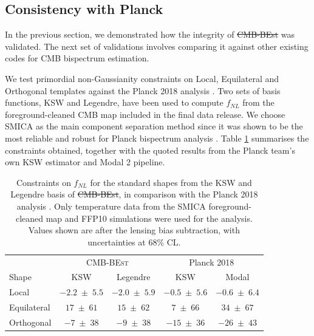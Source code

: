 \documentclass[a4paper,12pt,times,custombib,print,index]{Classes/PhDThesisPSnPDF} %
\providecommand{\DIFadd}[1]{{\protect\color{blue}\uwave{#1}}} %
\providecommand{\DIFdel}[1]{{\protect\color{red}\sout{#1}}}                      %
\providecommand{\DIFaddbegin}{} %
\providecommand{\DIFaddend}{} %
\providecommand{\DIFdelbegin}{} %
\providecommand{\DIFdelend}{} %
\providecommand{\DIFaddFL}[1]{\DIFadd{#1}} %
\providecommand{\DIFdelFL}[1]{\DIFdel{#1}} %
\providecommand{\DIFaddbeginFL}{} %
\providecommand{\DIFaddendFL}{} %
\providecommand{\DIFdelbeginFL}{} %
\providecommand{\DIFdelendFL}{} %
\newcommand{\DIFscaledelfig}{0.5}
\newlength{\DIFdelgraphicswidth} %
\newlength{\DIFdelgraphicsheight} %
\newcommand{\DIFaddincludegraphics}[2][]{{\color{blue}\fbox{\DIFOincludegraphics[#1]{#2}}}} %
\newcommand{\DIFdelincludegraphics}[2][]{%
\sbox{\DIFdelgraphicsbox}{\DIFOincludegraphics[#1]{#2}}%
\settoboxwidth{\DIFdelgraphicswidth}{\DIFdelgraphicsbox} %
\settoboxtotalheight{\DIFdelgraphicsheight}{\DIFdelgraphicsbox} %
\scalebox{\DIFscaledelfig}{%
\parbox[b]{\DIFdelgraphicswidth}{\usebox{\DIFdelgraphicsbox}\\[-\baselineskip] \rule{\DIFdelgraphicswidth}{0em}}\llap{\resizebox{\DIFdelgraphicswidth}{\DIFdelgraphicsheight}{%
\setlength{\unitlength}{\DIFdelgraphicswidth}%
\begin{picture}(1,1)%
\thicklines\linethickness{2pt} %
{\color[rgb]{1,0,0}\put(0,0){\framebox(1,1){}}}%
{\color[rgb]{1,0,0}\put(0,0){\line( 1,1){1}}}%
{\color[rgb]{1,0,0}\put(0,1){\line(1,-1){1}}}%
\end{picture}%
}\hspace*{3pt}}} %
} %
\DeclareRobustCommand{\DIFaddbegin}{\DIFOaddbegin \let\includegraphics\DIFaddincludegraphics} %
\DeclareRobustCommand{\DIFaddend}{\DIFOaddend \let\includegraphics\DIFOincludegraphics} %
\DeclareRobustCommand{\DIFdelbegin}{\DIFOdelbegin \let\includegraphics\DIFdelincludegraphics} %
\DeclareRobustCommand{\DIFdelend}{\DIFOaddend \let\includegraphics\DIFOincludegraphics} %
\DeclareRobustCommand{\DIFaddbeginFL}{\DIFOaddbeginFL \let\includegraphics\DIFaddincludegraphics} %
\DeclareRobustCommand{\DIFaddendFL}{\DIFOaddendFL \let\includegraphics\DIFOincludegraphics} %
\DeclareRobustCommand{\DIFdelbeginFL}{\DIFOdelbeginFL \let\includegraphics\DIFdelincludegraphics} %
\DeclareRobustCommand{\DIFdelendFL}{\DIFOaddendFL \let\includegraphics\DIFOincludegraphics} %
\begin{document}
\subsection{Consistency with Planck} \label{section:consistency_with_Planck}

In the previous section, we demonstrated how the integrity of \DIFdelbegin \DIFdel{CMB-BEst }\DIFdelend \DIFaddbegin \textsc{\DIFadd{CMB-BEst}} \DIFaddend was validated. The next set of validations involves comparing it against other existing codes for CMB bispectrum estimation.

We test primordial non-Gaussianity constraints on Local, Equilateral and Orthogonal templates against the Planck 2018 analysis \cite{PlanckCollaboration2018}. Two sets of basis functions, KSW and Legendre, have been used to compute \DIFdelbegin \DIFdel{$f_{NL}$ }\DIFdelend \DIFaddbegin \DIFadd{$f_\text{NL}$ }\DIFaddend from the foreground-cleaned CMB map included in the final data release. We choose SMICA as the main component separation method since it was shown to be the most reliable and robust for Planck bispectrum analysis \cite{PlanckCollaboration2013ComponentSeparation, PlanckCollaboration2013,PlanckCollaboration2015,PlanckCollaboration2018}. Table \ref{table:trio_fNL_comparison_with_planck} summarises the constraints obtained, together with the quoted results from the Planck team's own KSW estimator and Modal 2 pipeline.

\begin{table}[h]
	\caption{Constraints on \DIFdelbeginFL \DIFdelFL{$f_{NL}$ }\DIFdelendFL \DIFaddbeginFL \DIFaddFL{$f_\text{NL}$ }\DIFaddendFL for the standard shapes from the KSW and Legendre basis of \DIFdelbeginFL \DIFdelFL{CMB-BEst}\DIFdelendFL \DIFaddbeginFL \textsc{\DIFaddFL{CMB-BEst}}\DIFaddendFL , in comparison with the Planck 2018 analysis \cite{PlanckCollaboration2018}. Only \DIFaddbeginFL \DIFaddFL{the }\DIFaddendFL temperature data from the SMICA foreground-cleaned map and FFP10 simulations were used for the analysis. Values shown are after the lensing bias subtraction, with uncertainties at 68\% CL.}
	\centering
	\label{table:trio_fNL_comparison_with_planck}
	\renewcommand{\arraystretch}{1.5} 
	\begin{tabular}{lcccc}
		\toprule
		& \DIFdelbeginFL %
\DIFdelendFL \DIFaddbeginFL \multicolumn{2}{c}{\textsc{CMB-BEst}} \DIFaddendFL & \multicolumn{2}{c}{Planck 2018} \\ \cmidrule(lr){2-3} \cmidrule(lr){4-5}
		Shape & KSW &  Legendre &  KSW &  Modal \\
		\midrule

		Local & $-2.2 \;\pm\; 5.5$ & $-2.0 \;\pm\; 5.9$ & $-0.5 \;\pm\; 5.6$ & $-0.6 \;\pm\; 6.4$ \\
		Equilateral & $17 \;\pm\; 61$ & $15 \;\pm\; 62$ & $7 \;\pm\; 66$ & $34 \;\pm\; 67$ \\
		Orthogonal & $-7 \;\pm\; 38$ & $-9 \;\pm\; 38$ & $-15 \;\pm\; 36$ & $-26 \;\pm\; 43$ \\
		\bottomrule
	\end{tabular}
\end{table}
\end{document}
